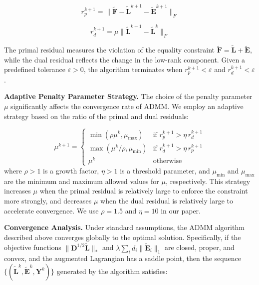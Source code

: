 \begin{equation}
r_p^{k+1} = \|\tilde{\mathbf{F}} - \tilde{\mathbf{L}}^{k+1} - \tilde{\mathbf{E}}^{k+1}\|_F
\end{equation}

\begin{equation}
r_d^{k+1} = \mu \|\tilde{\mathbf{L}}^{k+1} - \tilde{\mathbf{L}}^{k}\|_F
\end{equation}

The primal residual measures the violation of the equality constraint $\tilde{\mathbf{F}} = \tilde{\mathbf{L}} + \tilde{\mathbf{E}}$, while the dual residual reflects the change in the low-rank component. Given a predefined tolerance $\varepsilon > 0$, the algorithm terminates when $r_p^{k+1} < \varepsilon$ and $r_d^{k+1} < \varepsilon$.

\noindent\textbf{Adaptive Penalty Parameter Strategy.}
The choice of the penalty parameter $\mu$ significantly affects the convergence rate of ADMM. We employ an adaptive strategy based on the ratio of the primal and dual residuals:

\begin{equation}
\mu^{k+1} = 
\begin{cases}
\min(\rho \mu^k, \mu_{\max}) & \text{if } r_p^{k+1} > \eta \, r_d^{k+1} \\
\max(\mu^k / \rho, \mu_{\min}) & \text{if } r_d^{k+1} > \eta \, r_p^{k+1} \\
\mu^k & \text{otherwise}
\end{cases}
\label{eq:mu-adaptation}
\end{equation}
where $\rho > 1$ is a growth factor, $\eta > 1$ is a threshold parameter, and $\mu_{\min}$ and $\mu_{\max}$ are the minimum and maximum allowed values for $\mu$, respectively. This strategy increases $\mu$ when the primal residual is relatively large to enforce the constraint more strongly, and decreases $\mu$ when the dual residual is relatively large to accelerate convergence. We use $\rho=1.5$ and $\eta=10$ in our paper.

\noindent\textbf{Convergence Analysis.}
Under standard assumptions, the ADMM algorithm described above converges globally to the optimal solution. Specifically, if the objective functions $\|\mathbf{D}^{1/2} \tilde{\mathbf{L}}\|_*$ and $\lambda \sum_i d_i \|\tilde{\mathbf{E}}_i\|_1$ are closed, proper, and convex, and the augmented Lagrangian has a saddle point, then the sequence $\{(\tilde{\mathbf{L}}^k, \tilde{\mathbf{E}}^k, \mathbf{Y}^k)\}$ generated by the algorithm satisfies:

